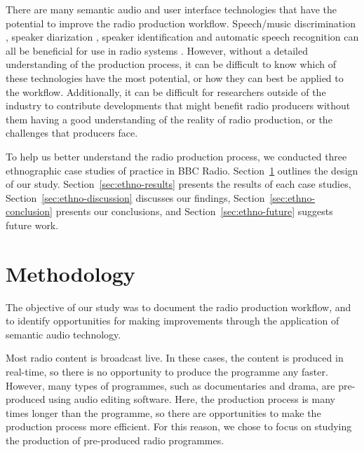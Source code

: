 
There are many semantic audio and user interface technologies that have the potential to improve the radio production
workflow. Speech/music discrimination \citep{Wieser2014}, speaker diarization \citep{AngueraMiro2012}, speaker
identification \citep{Lee1999a} and automatic speech recognition \citep{Junqua1995} can all be beneficial for use in
radio systems \citep{Raimond2014,Bell2015}.  However, without a detailed understanding of the production process, it
can be difficult to know which of these technologies have the most potential, or how they can best be applied to the
workflow.  Additionally, it can be difficult for researchers outside of the industry to contribute developments that
might benefit radio producers without them having a good understanding of the reality of radio production, or the
challenges that producers face.


To help us better understand the radio production process, we conducted three ethnographic case studies of practice in
BBC Radio.
Section~\ref{sec:ethno-method} outlines the design of our study.
Section~\ref{sec:ethno-results} presents the results of each case studies,
Section~\ref{sec:ethno-discussion} discusses our findings, 
Section~\ref{sec:ethno-conclusion} presents our conclusions, and
Section~\ref{sec:ethno-future} suggests future work.

\section{Methodology}\label{sec:ethno-method}


The objective of our study was to document the radio production workflow, and to identify opportunities for making
improvements through the application of semantic audio technology.

Most radio content is broadcast live. In these cases, the content is produced in real-time, so there is no opportunity
to produce the programme any faster. However, many types of programmes, such as documentaries and drama, are
pre-produced using audio editing software. Here, the production process is many times longer than the programme, so
there are opportunities to make the production process more efficient.  For this reason, we chose to focus on studying
the production of pre-produced radio programmes.

